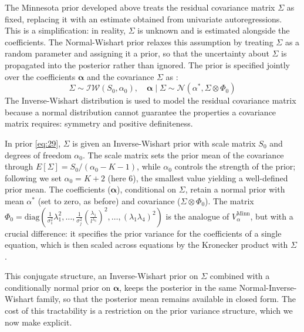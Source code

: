 \documentclass[12pt, a4paper]{article}
\begin{document}
The Minnesota prior developed above treats the residual covariance matrix $\Sigma$ as fixed, replacing it with an estimate obtained from univariate autoregressions. This is a simplification: in reality, $\Sigma$ is unknown and is estimated alongside the coefficients. The Normal-Wishart prior relaxes this assumption by treating $\Sigma$ as a random parameter and assigning it a prior, so that the uncertainty about $\Sigma$ is propagated into the posterior rather than ignored. The prior is specified jointly over the coefficients $\boldsymbol{\alpha}$ and the covariance $\Sigma$ as \citet{dieppeBEARToolbox2016}:
\begin{equation} \label{eq:29}
\Sigma \sim \mathcal{IW}(S_0, \alpha_0), \quad \boldsymbol{\alpha} \mid \Sigma \sim \mathcal{N}(\alpha^*, \Sigma \otimes \Phi_0)
\end{equation}
The Inverse-Wishart distribution is used to model the residual covariance matrix because a normal distribution cannot guarantee the properties a covariance matrix requires: symmetry and positive definiteness.

In prior \eqref{eq:29}, $\Sigma$ is given an Inverse-Wishart prior with scale matrix $S_0$ and degrees of freedom $\alpha_0$. The scale matrix sets the prior mean of the covariance through $E[\Sigma] = S_0/(\alpha_0 - K - 1)$, while $\alpha_0$ controls the strength of the prior; following \citet{dieppeBEARToolbox2016} we set $\alpha_0 = K + 2$ (here 6), the smallest value yielding a well-defined prior mean. The coefficients ($\boldsymbol{\alpha}$), conditional on $\Sigma$, retain a normal prior with mean $\alpha^{*}$ (set to zero, as before) and covariance ($\Sigma \otimes \Phi_0$). The matrix $\Phi_0 = \mathrm{diag} \left( \frac{1}{\sigma_1^2} \lambda_1^2, \dots, \frac{1}{\sigma_j^2} \left( \frac{\lambda_1}{l^{\lambda_3}} \right)^2, \dots, (\lambda_1 \lambda_4)^2 \right)$ is the analogue of $V_\alpha^{\text{Minn}}$, but with a crucial difference: it specifies the prior variance for the coefficients of a single equation, which is then scaled across equations by the Kronecker product with $\Sigma$ \citep{dieppeBEARToolbox2016}.

This conjugate structure, an Inverse-Wishart prior on $\Sigma$ combined with a conditionally normal prior on $\boldsymbol{\alpha}$, keeps the posterior in the same Normal-Inverse-Wishart family, so that the posterior mean remains available in closed form. The cost of this tractability is a restriction on the prior variance structure, which we now make explicit.
\end{document}
